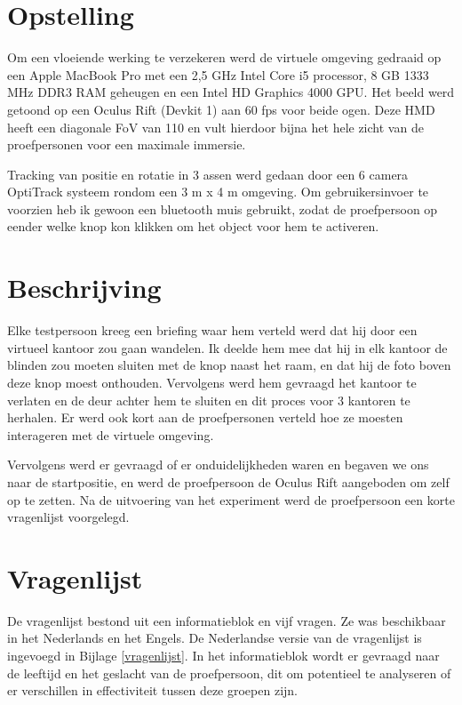 \section{Opstelling}
Om een vloeiende werking te verzekeren werd de virtuele omgeving gedraaid op een
Apple MacBook Pro met een 2,5 GHz Intel Core i5 processor, 8 GB 1333 MHz DDR3 RAM
geheugen en een Intel HD Graphics 4000 GPU. Het beeld werd getoond op een Oculus 
Rift (Devkit 1) aan 60 fps voor beide ogen. Deze HMD heeft een diagonale FoV van 
110\textdegree{} en vult hierdoor bijna het hele zicht van de proefpersonen voor 
een maximale immersie.

Tracking van positie en rotatie in 3 assen werd gedaan door een 6 camera
OptiTrack systeem rondom een 3 m x 4 m omgeving. Om gebruikersinvoer te voorzien 
heb ik gewoon een bluetooth muis gebruikt, zodat de proefpersoon op eender welke 
knop kon klikken om het object voor hem te activeren.

\section{Beschrijving}
Elke testpersoon kreeg een 
briefing waar hem verteld werd dat hij door een virtueel kantoor zou gaan
wandelen. Ik deelde hem mee dat hij in elk kantoor de blinden zou moeten sluiten 
met de knop naast het raam, en dat hij de foto boven deze knop moest onthouden.
Vervolgens werd hem gevraagd het kantoor te verlaten en de deur achter hem te
sluiten en dit proces voor 3 kantoren te herhalen. Er werd ook kort aan de 
proefpersonen verteld hoe ze moesten interageren met de virtuele omgeving.

Vervolgens werd er gevraagd of er onduidelijkheden waren en begaven we ons naar 
de startpositie, en werd de proefpersoon de Oculus Rift aangeboden om zelf op te 
zetten. Na de uitvoering van het experiment werd de proefpersoon een korte 
vragenlijst voorgelegd.


\section{Vragenlijst}
De vragenlijst bestond uit een informatieblok en vijf vragen. Ze was beschikbaar
in het Nederlands en het Engels. De Nederlandse versie van de vragenlijst is
ingevoegd in Bijlage \ref{vragenlijst}. In het informatieblok wordt er gevraagd 
naar de leeftijd en het geslacht van de proefpersoon, dit om potentieel te 
analyseren of er verschillen in effectiviteit tussen deze groepen zijn.

